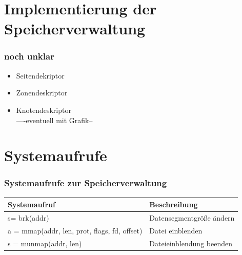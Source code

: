 \documentclass[ddcfooter]{tudbeamer}
\begin{document}
\section{Implementierung der Speicherverwaltung}
%   
%

\begin{frame}
    \frametitle{noch unklar}
   
   \begin{itemize}
         		\item Seitendekriptor
		\item Zonendeskriptor
		\item Knotendeskriptor\\
			
			----eventuell mit Grafik--
			
	
   	\end{itemize} 

   
       
\end{frame}



\section{Systemaufrufe}
\begin{frame}
    \frametitle{Systemaufrufe zur Speicherverwaltung}
   
    \begin{center}
   	 \begin{tabular}{ | l |m{5cm} |}
   	 \hline
   	 Systemaufruf & Beschreibung \\ \hline
    	s= brk(addr) & Datensegmentgröße ändern \\ \hline
    	a = mmap(addr, len, prot, flags, fd, offset)&  Datei einblenden \\ \hline
    	s = munmap(addr, len)  & Dateieinblendung beenden\\ \hline
    	\end{tabular}
    \end{center} 
       
\end{frame}
\end{document}
